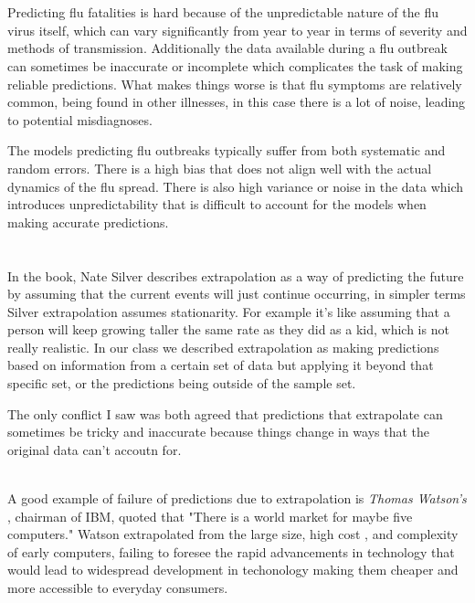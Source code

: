 \documentclass[12pt]{article}
\begin{document}
\begin{enumerate}

 \\  \\
Predicting flu fatalities is hard because of the unpredictable nature of the flu virus itself, which can vary significantly from year to year in terms of severity and methods of transmission. Additionally the data available during a flu outbreak can sometimes be inaccurate or incomplete which complicates the task of making reliable predictions. What makes things worse is that flu symptoms are relatively common, being found in other illnesses, in this case there is a lot of noise, leading to potential misdiagnoses. 

The models predicting flu outbreaks typically suffer from both systematic and random errors. There is a high bias that does not align well with the actual dynamics of the flu spread. There is also high variance or noise in the data which introduces unpredictability that is difficult to account for the models when making accurate predictions. \\ 

 \\\\
In the book, Nate Silver describes extrapolation as a way of predicting the future by assuming that the current events will just continue occurring, in simpler terms Silver extrapolation assumes stationarity. For example it's like assuming that a person will keep growing taller the same rate as they did as a kid, which is not really realistic.  In our class we described extrapolation as making predictions based on information from a certain set of data but applying it beyond that specific set, or the predictions being outside of the sample set. 

The only conflict I saw was both agreed that predictions that extrapolate can sometimes be tricky and inaccurate because things change in ways that the original data can't accoutn for. 

 \\
A good example of failure of predictions due to extrapolation is \textit{Thomas Watson's }, chairman of IBM, quoted that "There is a world market for maybe five computers." Watson extrapolated from the large size, high cost , and complexity of early computers, failing to foresee the rapid advancements in technology that would lead to widespread development in techonology making them cheaper and more accessible to everyday consumers.


\end{enumerate}
\end{document}
